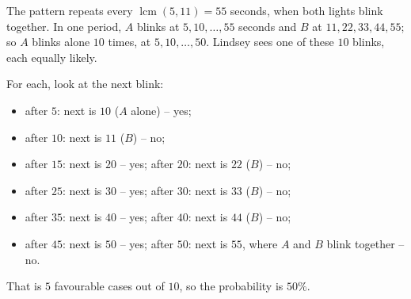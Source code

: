 The pattern repeats every $\operatorname{lcm}(5,11)=55$ seconds, when both lights blink together. In one period, $A$ blinks at $5,10,\dots,55$ seconds and $B$ at $11,22,33,44,55$; so $A$ blinks alone $10$ times, at $5,10,\dots,50$. Lindsey sees one of these $10$ blinks, each equally likely.

For each, look at the next blink:
\begin{itemize}
\item after $5$: next is $10$ ($A$ alone) -- yes;
\item after $10$: next is $11$ ($B$) -- no;
\item after $15$: next is $20$ -- yes; after $20$: next is $22$ ($B$) -- no;
\item after $25$: next is $30$ -- yes; after $30$: next is $33$ ($B$) -- no;
\item after $35$: next is $40$ -- yes; after $40$: next is $44$ ($B$) -- no;
\item after $45$: next is $50$ -- yes; after $50$: next is $55$, where $A$ and $B$ blink together -- no.
\end{itemize}
That is $5$ favourable cases out of $10$, so the probability is $\boxed{50\%}$.
